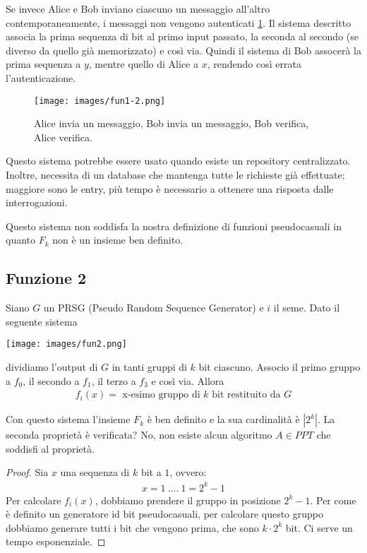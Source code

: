 Se invece Alice e Bob inviano ciascuno un messaggio all'altro contemporaneamente, i messaggi non vengono autenticati \ref{fig:fun1-2}. Il sistema descritto associa la prima sequenza di bit al primo input passato, la seconda al secondo (se diverso da quello già memorizzato) e così via. Quindi il sistema di Bob assocerà la prima sequenza a $y$, mentre quello di Alice a $x$, rendendo così errata l'autenticazione. 
\begin{figure}
    \centering
    \texttt{[image: images/fun1-2.png]}
    \caption{Alice invia un messaggio, Bob invia un messaggio, Bob verifica, Alice verifica.}
    \label{fig:fun1-2}
\end{figure}

\noindent Questo sistema potrebbe essere usato quando esiste un repository centralizzato. Inoltre, necessita di un database che mantenga tutte le richieste già effettuate; maggiore sono le entry, più tempo è necessario a ottenere una risposta dalle interrogazioni.

Questo sistema non soddisfa la nostra definizione di funzioni pseudocasuali in quanto $F_k$ non è un insieme ben definito.

\subsection{Funzione 2}
Siano $G$ un PRSG (Pseudo Random Sequence Generator) e $i$ il seme. Dato il seguente sistema
\begin{center}
    \texttt{[image: images/fun2.png]}
\end{center}

\noindent dividiamo l'output di $G$ in tanti gruppi di $k$ bit ciascuno. Associo il primo gruppo a $f_0$, il secondo a $f_1$, il terzo a $f_3$ e così via. Allora 
\begin{align*}
    f_i(x) = \text{ x-esimo gruppo di $k$ bit restituito da $G$}
\end{align*}

\noindent Con questo sistema l'insieme $F_k$ è ben definito e la sua cardinalità è $|2^k|$. La seconda proprietà è verificata? No, non esiste alcun algoritmo $A \in PPT$ che soddisfi al proprietà.
\begin{proof}
    Sia $x$ una sequenza di $k$ bit a $1$, ovvero:
    \begin{align*}
       x = 1 \ .... \ 1 = 2^{k}-1
    \end{align*}
    \noindent Per calcolare $f_i(x)$, dobbiamo prendere il gruppo in posizione $2^k-1$. Per come è definito un generatore id bit pseudocasuali, per calcolare questo gruppo dobbiamo generare tutti i bit che vengono prima, che sono $k \cdot 2^k$ bit. Ci serve un tempo esponenziale.
\end{proof}

